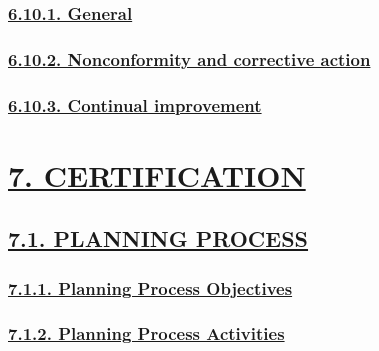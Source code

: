 \documentclass[
]{article}
\begin{document}
\hypertarget{general-8}{%
\subsubsection{\texorpdfstring{\protect\hyperlink{general-17}{6.10.1.
General}}{6.10.1. General}}\label{general-8}}

\hypertarget{nonconformity-and-corrective-action}{%
\subsubsection{\texorpdfstring{\protect\hyperlink{nonconformity-and-corrective-action-1}{6.10.2.
Nonconformity and corrective
action}}{6.10.2. Nonconformity and corrective action}}\label{nonconformity-and-corrective-action}}

\hypertarget{continual-improvement}{%
\subsubsection{\texorpdfstring{\protect\hyperlink{continual-improvement-1}{6.10.3.
Continual
improvement}}{6.10.3. Continual improvement}}\label{continual-improvement}}

\hypertarget{certification}{%
\section{\texorpdfstring{\protect\hyperlink{certification-1}{7.
CERTIFICATION}}{7. CERTIFICATION}}\label{certification}}

\hypertarget{planning-process}{%
\subsection{\texorpdfstring{\protect\hyperlink{planning-process-1}{7.1.
PLANNING PROCESS}}{7.1. PLANNING PROCESS}}\label{planning-process}}

\hypertarget{planning-process-objectives}{%
\subsubsection{\texorpdfstring{\protect\hyperlink{planning-process-objectives-1}{7.1.1.
Planning Process
Objectives}}{7.1.1. Planning Process Objectives}}\label{planning-process-objectives}}

\hypertarget{planning-process-activities}{%
\subsubsection{\texorpdfstring{\protect\hyperlink{planning-process-activities-1}{7.1.2.
Planning Process
Activities}}{7.1.2. Planning Process Activities}}\label{planning-process-activities}}
\end{document}

